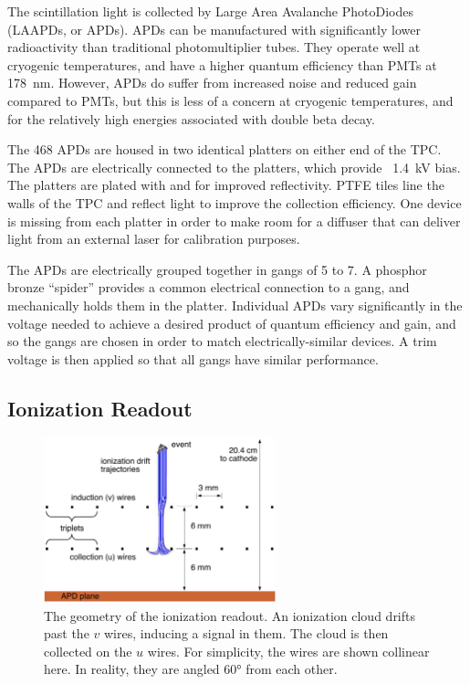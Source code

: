 \documentclass[herrin-thesis.tex]{subfiles}
\begin{document}
The scintillation light is collected by Large Area Avalanche PhotoDiodes (LAAPDs, or APDs). APDs can be manufactured with significantly lower radioactivity than traditional photomultiplier tubes. They operate well at cryogenic temperatures, and have a higher quantum efficiency than PMTs at \SI{178}{\nm}. However, APDs do suffer from increased noise and reduced gain compared to PMTs, but this is less of a concern at cryogenic temperatures, and for the relatively high energies associated with double beta decay.

The 468 APDs are housed in two identical platters on either end of the TPC. The APDs are electrically connected to the platters, which provide \about~\SI{1.4}{\kV} bias. The platters are plated with  and  for improved reflectivity. PTFE tiles line the walls of the TPC and reflect light to improve the collection efficiency. One device is missing from each platter in order to make room for a diffuser that can deliver light from an external laser for calibration purposes.

The APDs are electrically grouped together in gangs of 5 to 7. A phosphor bronze ``spider'' provides a common electrical connection to a gang, and mechanically holds them in the platter. Individual APDs vary significantly in the voltage needed to achieve a desired product of quantum efficiency and gain, and so the gangs are chosen in order to match electrically-similar devices\cite{Neilson:2009fk}. A trim voltage is then applied so that all gangs have similar performance.

\subsection{Ionization Readout}

\begin{figure}
\centering
\includegraphics[width=0.6\textwidth]{./figures/detector_wire_geometry.pdf}
\caption[Geometry of the ionization readout wire planes]{The geometry of the ionization readout. An ionization cloud drifts past the \(v\) wires, inducing a signal in them. The cloud is then collected on the \(u\) wires. For simplicity, the wires are shown collinear here. In reality, they are angled \ang{60} from each other.}
\label{fig:detector_wire_geometry}
\end{figure}
\end{document}
